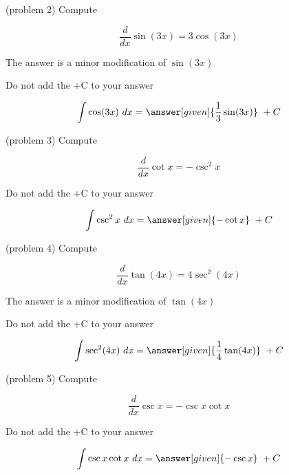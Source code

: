 \documentclass[handout]{ximera}
\begin{document}
\begin{problem}(problem 2)
Compute
\begin{hint}
\[
\frac{d}{dx} \sin(3x) = 3\cos(3x)
\]
\end{hint}
\begin{hint}
The answer is a minor modification of $\sin(3x)$
\end{hint}
\begin{hint}
\begin{center}
Do not add the +C to your answer
\end{center}
\end{hint}

\[
\int \cos(3x) \ dx =
\answer[given]{\frac13 \sin(3x)} \ + C
\]
\end{problem}



\begin{problem}(problem 3)
Compute 

\begin{hint}
\[
\frac{d}{dx} \cot x = -\csc^2 x
\]
\end{hint}
\begin{hint}
\begin{center}
Do not add the +C to your answer
\end{center}
\end{hint}

\[
\int \csc^2 x \ dx =
\answer[given]{-\cot x} \ + C
\]
\end{problem}

\begin{problem}(problem 4)
Compute 

\begin{hint}
\[
\frac{d}{dx} \tan(4x) = 4\sec^2(4x)
\]
\end{hint}
\begin{hint}
The answer is a minor modification of $\tan(4x)$
\end{hint}
\begin{hint}
\begin{center}
Do not add the +C to your answer
\end{center}
\end{hint}

\[
\int \sec^2(4x) \ dx =
\answer[given]{\frac14\tan(4x)} \ + C
\]
\end{problem}




\begin{problem}(problem 5)
Compute 

\begin{hint}
\[
\frac{d}{dx} \csc x = -\csc x\cot x
\]
\end{hint}
\begin{hint}
\begin{center}
Do not add the +C to your answer
\end{center}
\end{hint}

\[
\int \csc x\cot x \ dx =
\answer[given]{-\csc x} \ + C
\]
\end{problem}
\end{document}

